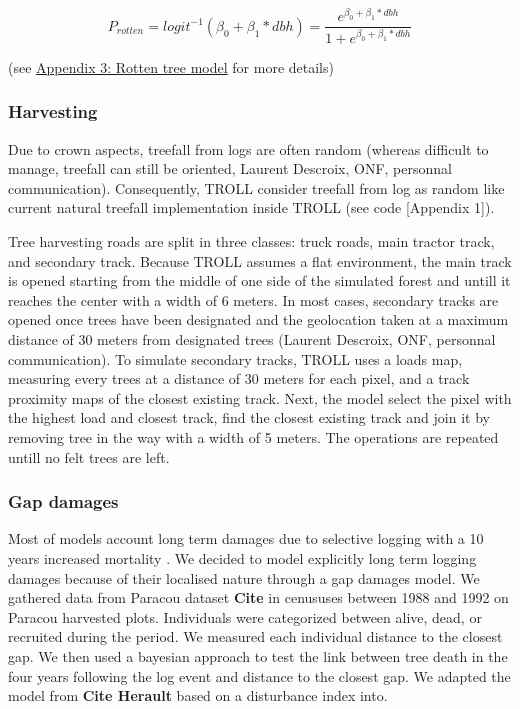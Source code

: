 \documentclass[12pt,]{article}
\theoremstyle{definition}
\theoremstyle{definition}
\theoremstyle{remark}
\begin{document}
\begin{equation}
  P_{rotten} = logit^{-1}(\beta_0 + \beta_1*dbh) = \frac{e^{\beta_0 + \beta_1*dbh}}{1 + e^{\beta_0 + \beta_1*dbh}}
  \label{eq:rotten}
\end{equation}

(see \protect\hyperlink{appendix-3-rotten-tree-model}{Appendix 3: Rotten
tree model} for more details)

\subsubsection{Harvesting}\label{harvesting}

Due to crown aspects, treefall from logs are often random (whereas
difficult to manage, treefall can still be oriented, Laurent Descroix,
ONF, personnal communication). Consequently, TROLL consider treefall
from log as random like current natural treefall implementation inside
TROLL (see code {[}Appendix 1{]}).

Tree harvesting roads are split in three classes: truck roads, main
tractor track, and secondary track. Because TROLL assumes a flat
environment, the main track is opened starting from the middle of one
side of the simulated forest and untill it reaches the center with a
width of 6 meters. In most cases, secondary tracks are opened once trees
have been designated and the geolocation taken at a maximum distance of
30 meters from designated trees (Laurent Descroix, ONF, personnal
communication). To simulate secondary tracks, TROLL uses a loads map,
measuring every trees at a distance of 30 meters for each pixel, and a
track proximity maps of the closest existing track. Next, the model
select the pixel with the highest load and closest track, find the
closest existing track and join it by removing tree in the way with a
width of 5 meters. The operations are repeated untill no felt trees are
left.

\subsubsection{Gap damages}\label{gap-damages}

Most of models account long term damages due to selective logging with a
10 years increased mortality \citep{Huth2004, Khler2004, Ruger2008}. We
decided to model explicitly long term logging damages because of their
localised nature through a gap damages model. We gathered data from
Paracou dataset \textbf{Cite} in cenususes between 1988 and 1992 on
Paracou harvested plots. Individuals were categorized between alive,
dead, or recruited during the period. We measured each individual
distance to the closest gap. We then used a bayesian approach to test
the link between tree death in the four years following the log event
and distance to the closest gap. We adapted the model from \textbf{Cite
Herault} based on a disturbance index into.
\end{document}
